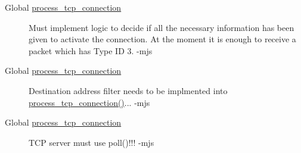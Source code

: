 \label{todo__todo000017}
\hypertarget{todo__todo000017}{}
 \begin{description}
\item[Global \hyperlink{tcpserver_8c_0eb8fdec50bfdfa77f5dca2e40ba7f99}{process\_\-tcp\_\-connection} ]Must implement logic to decide if all the necessary information has been given to activate the connection. At the moment it is enough to receive a packet which has Type ID 3. -mjs \end{description}


\label{todo__todo000017}
\hypertarget{todo__todo000017}{}
 \begin{description}
\item[Global \hyperlink{tcpserver_8c_0eb8fdec50bfdfa77f5dca2e40ba7f99}{process\_\-tcp\_\-connection} ]Destination address filter needs to be implmented into \hyperlink{tcpserver_8c_0eb8fdec50bfdfa77f5dca2e40ba7f99}{process\_\-tcp\_\-connection()}... -mjs \end{description}


\label{todo__todo000017}
\hypertarget{todo__todo000017}{}
 \begin{description}
\item[Global \hyperlink{tcpserver_8c_0eb8fdec50bfdfa77f5dca2e40ba7f99}{process\_\-tcp\_\-connection} ]TCP server must use poll()!!! -mjs \end{description}
